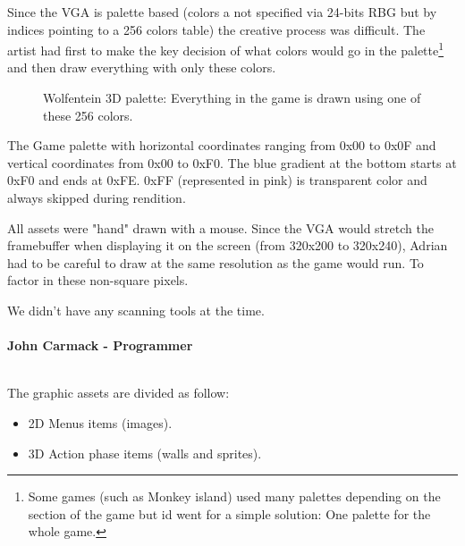 \documentclass[book.tex]{subfiles}
\begin{document}
\par
Since the VGA is palette based (colors a not specified via 24-bits RBG but by indices pointing to a 256 colors table) the creative process was difficult. The artist had first to make the key decision of what colors would go in the palette\footnote{Some games (such as Monkey island) used many palettes depending on the section of the game but id went for a simple solution: One palette for the whole game.} and then draw everything with only these colors.\\
\begin{figure}[H]
  \centering
{}
 \caption{Wolfentein 3D palette: Everything in the game is drawn using one of these 256 colors.}
\end{figure}
The Game palette with horizontal coordinates ranging from 0x00 to 0x0F and vertical coordinates from 0x00 to 0xF0. The blue gradient at the bottom starts at 0xF0 and ends at 0xFE. 0xFF (represented in pink) is transparent color and always skipped during rendition.\\
\par

All assets were "hand" drawn with a mouse. Since the VGA would stretch the framebuffer when displaying it on the screen (from 320x200 to 320x240), Adrian had to be careful to draw at the same resolution as the game would run. To factor in these non-square pixels.\\
\par
\begin{fancyquotes}
We didn't have any scanning tools at the time.\\
\\
\textbf{John Carmack - Programmer}
\end{fancyquotes}
\\
The graphic assets are divided as follow:
\begin{itemize}
\item 2D Menus items (images).
\item 3D Action phase items (walls and sprites).
\end{itemize}
\end{document}
